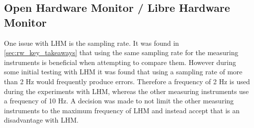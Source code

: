 
\subsection{Open Hardware Monitor / Libre Hardware Monitor}
One issue with LHM is the sampling rate. It was found in \cref{sec:rw_key_takeaways} that using the same sampling rate for the measuring instruments is beneficial when attempting to compare them. However during some initial testing with LHM it was found that using a sampling rate of more than 2 Hz would frequently produce errors. Therefore a frequency of 2 Hz is used during the experiments with LHM, whereas the other measuring instruments use a frequency of 10 Hz. A decision was made to not limit the other measuring instruments to the maximum frequency of LHM and instead accept that is an disadvantage with LHM.